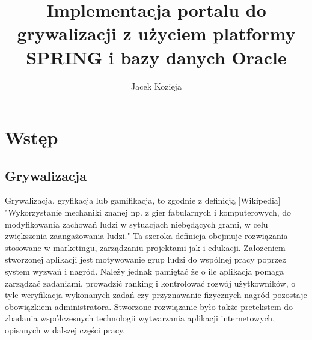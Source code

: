 \documentclass[a4paper,12pt,twoside,openany]{report}
\title{Implementacja portalu do grywalizacji z użyciem platformy SPRING i bazy danych Oracle}
\author{Jacek Kozieja}
\begin{document}
\maketitle

\chapter{Wstęp}
\section{Grywalizacja}
	Grywalizacja, gryfikacja lub gamifikacja, to zgodnie z definicją [Wikipedia] "Wykorzystanie mechaniki znanej np. z gier fabularnych i komputerowych, do modyfikowania zachowań ludzi w sytuacjach niebędących grami, w celu zwiększenia zaangażowania ludzi." Ta szeroka definicja obejmuje rozwiązania stosowane w marketingu, zarządzaniu projektami jak i edukacji. Założeniem stworzonej aplikacji jest motywowanie grup ludzi do wspólnej pracy poprzez system wyzwań i nagród. Należy jednak pamiętać że o ile aplikacja pomaga zarządzać zadaniami, prowadzić ranking i kontrolować rozwój użytkowników, o tyle weryfikacja wykonanych zadań czy przyznawanie fizycznych nagród pozostaje obowiązkiem administratora. Stworzone rozwiązanie było także pretekstem do zbadania współczesnych technologii wytwarzania aplikacji internetowych, opisanych w dalszej części pracy. 
\end{document}
